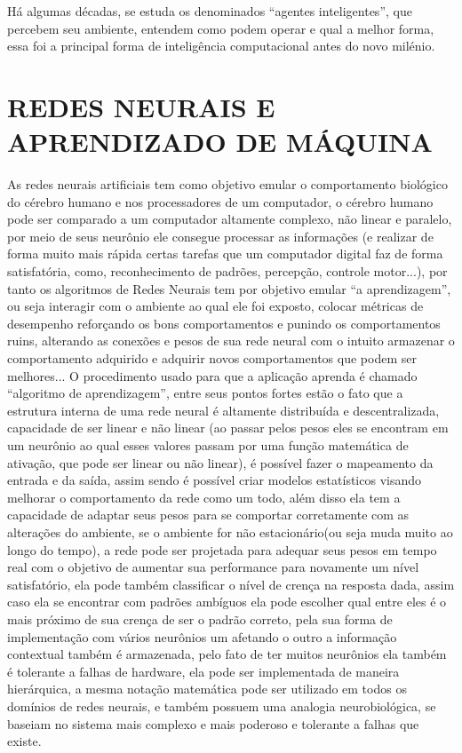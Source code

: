 Há algumas décadas, se estuda os denominados “agentes inteligentes”, que percebem seu ambiente, entendem como podem operar e qual a melhor forma, essa foi a principal forma de inteligência computacional antes do novo milénio.

\section{REDES NEURAIS E APRENDIZADO DE MÁQUINA}
\label{sec:REDESNEURAISEAPRENDIZADODEMÁQUINA}

As redes neurais artificiais tem como objetivo emular o comportamento biológico do cérebro humano e nos processadores de um computador, o cérebro humano pode ser comparado a um computador altamente complexo, não linear e paralelo, por meio de seus neurônio ele consegue processar as informações (e realizar de forma muito mais rápida certas tarefas que um computador digital faz de forma satisfatória, como, reconhecimento de padrões, percepção, controle motor...), por tanto os algoritmos de Redes Neurais tem por objetivo emular “a aprendizagem”, ou seja interagir com o ambiente ao qual ele foi exposto, colocar métricas de desempenho reforçando os bons comportamentos e punindo os comportamentos ruins, alterando as conexões e pesos de sua rede neural com o intuito armazenar o comportamento adquirido e adquirir novos comportamentos que podem ser melhores...  
O procedimento usado para que a aplicação aprenda é chamado “algoritmo de aprendizagem”, entre seus pontos fortes estão o fato que a estrutura interna de uma rede neural é altamente distribuída e descentralizada, capacidade de ser linear e não linear (ao passar pelos pesos eles se encontram em um neurônio ao qual esses valores passam por uma função matemática de ativação, que pode ser linear ou não linear), é possível fazer o mapeamento da entrada e da saída, assim sendo é possível criar modelos estatísticos visando melhorar o comportamento da rede como um todo, além disso ela tem a capacidade de adaptar seus pesos para se comportar corretamente com as alterações do ambiente, se o ambiente for não estacionário(ou seja muda muito ao longo do tempo), a rede pode ser projetada para adequar seus pesos em tempo real com o objetivo de aumentar sua performance para novamente um nível satisfatório, ela pode também classificar o nível de crença na resposta dada, assim caso ela se encontrar com padrões ambíguos ela pode escolher qual entre eles é o mais próximo de sua crença de ser o padrão correto, pela sua forma de implementação com vários neurônios um afetando o outro a informação contextual também é armazenada, pelo fato de ter muitos neurônios ela também é tolerante a falhas de hardware, ela pode ser implementada de maneira hierárquica, a mesma notação matemática pode ser utilizado em todos os domínios de redes neurais, e também possuem uma analogia neurobiológica, se baseiam no sistema mais complexo e mais poderoso e tolerante a falhas que existe. 

